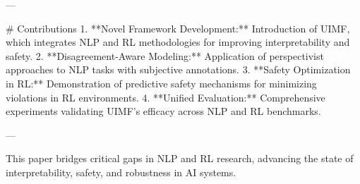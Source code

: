 ---

# Contributions  
1. **Novel Framework Development:** Introduction of UIMF, which integrates NLP and RL methodologies for improving interpretability and safety.  
2. **Disagreement-Aware Modeling:** Application of perspectivist approaches to NLP tasks with subjective annotations.  
3. **Safety Optimization in RL:** Demonstration of predictive safety mechanisms for minimizing violations in RL environments.  
4. **Unified Evaluation:** Comprehensive experiments validating UIMF's efficacy across NLP and RL benchmarks.  

--- 

This paper bridges critical gaps in NLP and RL research, advancing the state of interpretability, safety, and robustness in AI systems.